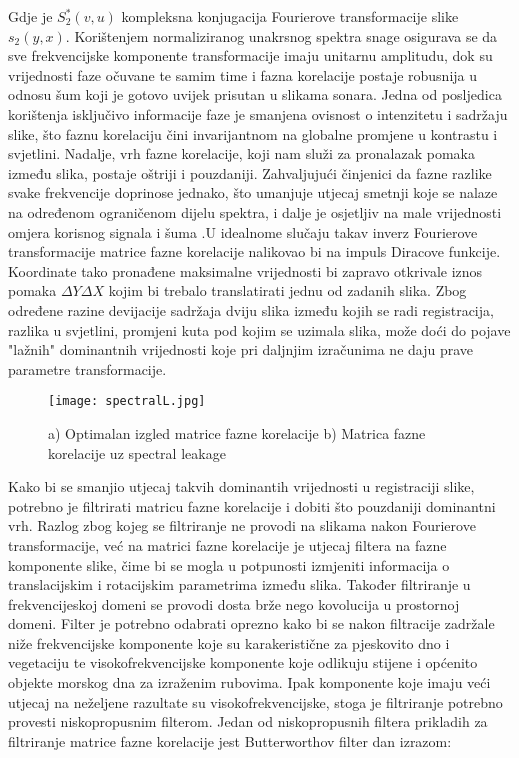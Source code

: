 \documentclass[times, utf8, diplomski]{fer}
\begin{document}
Gdje je $S_2^*(v,u)$ kompleksna konjugacija Fourierove transformacije slike $s_2(y,x)$. Korištenjem normaliziranog unakrsnog spektra snage osigurava se da sve frekvencijske komponente transformacije imaju unitarnu amplitudu, dok su vrijednosti faze očuvane te samim time i fazna korelacije postaje robusnija u odnosu šum koji je gotovo uvijek prisutan u slikama sonara. Jedna od posljedica korištenja isključivo informacije faze je smanjena ovisnost o intenzitetu i sadržaju slike, što faznu korelaciju čini invarijantnom na globalne promjene u kontrastu i svjetlini. Nadalje, vrh fazne korelacije, koji nam služi za pronalazak pomaka između slika, postaje oštriji i pouzdaniji. Zahvaljujući činjenici da fazne razlike svake frekvencije doprinose jednako, što umanjuje utjecaj smetnji koje se nalaze na određenom ograničenom dijelu spektra, i dalje je osjetljiv na male vrijednosti omjera korisnog signala i šuma .U idealnome slučaju takav inverz Fourierove transformacije matrice fazne korelacije nalikovao bi na impuls Diracove funkcije. Koordinate tako pronađene maksimalne vrijednosti bi zapravo otkrivale iznos pomaka $\Delta Y \Delta X$ kojim bi trebalo translatirati jednu od zadanih slika. Zbog određene razine devijacije sadržaja dviju slika između kojih se radi registracija, razlika u svjetlini, promjeni kuta pod kojim se uzimala slika, može doći do pojave "lažnih" dominantnih vrijednosti koje pri daljnjim izračunima ne daju prave parametre transformacije.
\begin{figure}[htb]
\centering
\texttt{[image: spectralL.jpg]}
\caption{a) Optimalan izgled matrice fazne korelacije b) Matrica fazne korelacije uz spectral leakage}
\label{fig:}
\end{figure}
  Kako bi se smanjio utjecaj takvih dominantih vrijednosti u registraciji slike, potrebno je filtrirati matricu fazne korelacije i dobiti što pouzdaniji dominantni vrh. Razlog zbog kojeg se filtriranje ne provodi na slikama nakon Fourierove transformacije, već na matrici fazne korelacije je utjecaj filtera na fazne komponente slike, čime bi se mogla u potpunosti izmjeniti informacija o translacijskim i rotacijskim parametrima između slika. Također filtriranje u frekvencijeskoj domeni se provodi dosta brže nego kovolucija u prostornoj domeni. Filter je potrebno odabrati oprezno kako bi se nakon filtracije zadržale niže frekvencijske komponente koje su karakeristične za pjeskovito dno i vegetaciju te visokofrekvencijske komponente koje odlikuju stijene i općenito objekte morskog dna za izraženim rubovima. Ipak komponente koje imaju veći utjecaj na neželjene razultate su visokofrekvencijske, stoga je filtriranje potrebno provesti niskopropusnim filterom. Jedan od niskopropusnih filtera prikladih za filtriranje matrice fazne korelacije jest Butterworthov filter dan izrazom:
  
\end{document}
